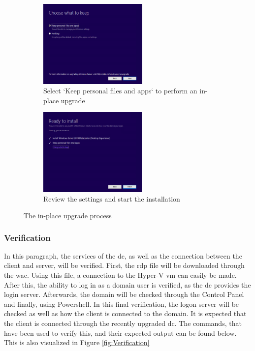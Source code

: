 \begin{figure}[h]\ContinuedFloat
	\begin{subfigure}{0.5\textwidth}
		\captionsetup{width=0.8\linewidth}
		\includegraphics[width=0.9\linewidth,height=4.3cm]{img/Methodologie/InPlace4.png} 
		\centering
		\caption{Select `Keep personal files and apps` to perform an in-place upgrade}
	\end{subfigure}
	\begin{subfigure}{0.5\textwidth}
		\captionsetup{width=0.8\linewidth}
		\includegraphics[width=0.9\linewidth,height=4.3cm]{img/Methodologie/InPlace5.png}
		\centering
		\caption{Review the settings and start the installation}
	\end{subfigure}
	\caption[In-place upgrade]{The in-place upgrade process}
	\label{fig:Inplace}
\end{figure}

\subsubsection{Verification}
In this paragraph, the services of the \acrshort{dc}, as well as the connection between the client and server, will be verified. 
First, the \acrfull{rdp} file will be downloaded through the \acrlong{wac}. 
Using this file, a connection to the Hyper-V \acrshort{vm} can easily be made. 
After this, the ability to log in as a domain user is verified, as the \acrshort{dc} provides the login server. 
Afterwards, the domain will be checked through the Control Panel and finally, using Powershell. 
In this final verification, the logon server will be checked as well as how the client is connected to the domain. 
It is expected that the client is connected through the recently upgraded \acrshort{dc}.
The commands, that have been used to verify this, and their expected output can be found below. 
This is also visualized in Figure \ref{fig:Verification}

